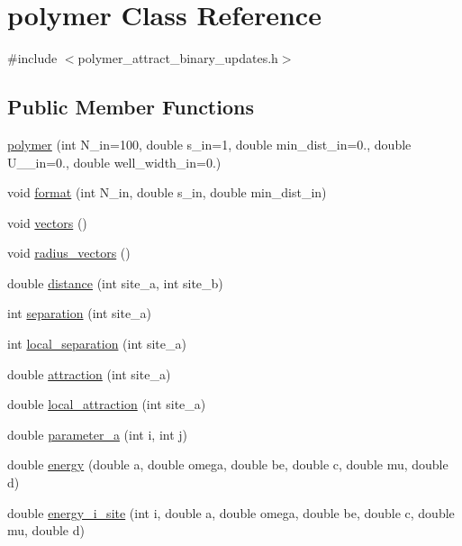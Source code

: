 \hypertarget{classpolymer}{}\section{polymer Class Reference}
\label{classpolymer}


{\ttfamily \#include $<$polymer\+\_\+attract\+\_\+binary\+\_\+updates.\+h$>$}

\subsection*{Public Member Functions}
\begin{DoxyCompactItemize}
\item 
\hyperlink{classpolymer_abf30f7effe8980e0a4afa2aa2a45c1aa}{polymer} (int N\+\_\+in=100, double s\+\_\+in=1, double min\+\_\+dist\+\_\+in=0., double U\+\_\+\_\+in=0., double well\+\_\+width\+\_\+in=0.)
\item 
void \hyperlink{classpolymer_a6ac7f37ee8e4dcdbbd08f8ecb9efee8b}{format} (int N\+\_\+in, double s\+\_\+in, double min\+\_\+dist\+\_\+in)
\item 
void \hyperlink{classpolymer_a0167c13d59c6840673a394c01b87f229}{vectors} ()
\item 
void \hyperlink{classpolymer_a914b3abcbc6c53907626193ee21169ac}{radius\+\_\+vectors} ()
\item 
double \hyperlink{classpolymer_aa27a989548b5622fa6eaab87440a31d5}{distance} (int site\+\_\+a, int site\+\_\+b)
\item 
int \hyperlink{classpolymer_ab001df23489a33c37e4dbe2f62cd4497}{separation} (int site\+\_\+a)
\item 
int \hyperlink{classpolymer_af79e005223b39b6d5c7446295056baa1}{local\+\_\+separation} (int site\+\_\+a)
\item 
double \hyperlink{classpolymer_ad9a1df0e2fea34450c47b9eb9d693e3d}{attraction} (int site\+\_\+a)
\item 
double \hyperlink{classpolymer_a0e0d69f865ca798256019fbe725d4955}{local\+\_\+attraction} (int site\+\_\+a)
\item 
double \hyperlink{classpolymer_ab1dd0274207c36a79b7fb5674e7d0ed6}{parameter\+\_\+a} (int i, int j)
\item 
double \hyperlink{classpolymer_aff2938b46080f7cf0f3795d23f3d5f17}{energy} (double a, double omega, double be, double c, double mu, double d)
\item 
double \hyperlink{classpolymer_a3b56762501aa220610ca1eadb69ffe06}{energy\+\_\+i\+\_\+site} (int i, double a, double omega, double be, double c, double mu, double d)

\end{DoxyCompactItemize}
